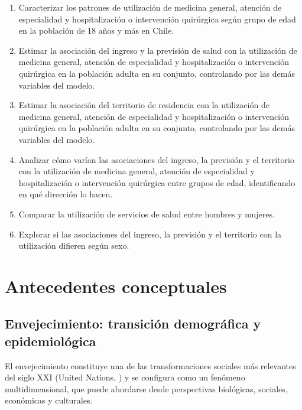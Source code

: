 \documentclass[
  spanish,
  a4paper,
  oneside]{scrbook}
\providecommand{\tightlist}{%
  \setlength{\itemsep}{0pt}\setlength{\parskip}{0pt}}
\begin{document}
\begin{enumerate}
\def\labelenumi{\arabic{enumi}.}
\tightlist
\item
  Caracterizar los patrones de utilización de medicina general, atención
  de especialidad y hospitalización o intervención quirúrgica según
  grupo de edad en la población de 18 años y más en Chile.
\item
  Estimar la asociación del ingreso y la previsión de salud con la
  utilización de medicina general, atención de especialidad y
  hospitalización o intervención quirúrgica en la población adulta en su
  conjunto, controlando por las demás variables del modelo.
\item
  Estimar la asociación del territorio de residencia con la utilización
  de medicina general, atención de especialidad y hospitalización o
  intervención quirúrgica en la población adulta en su conjunto,
  controlando por las demás variables del modelo.
\item
  Analizar cómo varían las asociaciones del ingreso, la previsión y el
  territorio con la utilización de medicina general, atención de
  especialidad y hospitalización o intervención quirúrgica entre grupos
  de edad, identificando en qué dirección lo hacen.
\item
  Comparar la utilización de servicios de salud entre hombres y mujeres.
\item
  Explorar si las asociaciones del ingreso, la previsión y el territorio
  con la utilización difieren según sexo.
\end{enumerate}


\chapter{Antecedentes conceptuales}\label{antecedentes-conceptuales}

\section{Envejecimiento: transición demográfica y
epidemiológica}\label{envejecimiento-transiciuxf3n-demogruxe1fica-y-epidemioluxf3gica}

El envejecimiento constituye una de las transformaciones sociales más
relevantes del siglo XXI (United Nations,
) y se configura como un
fenómeno multidimensional, que puede abordarse desde perspectivas
biológicas, sociales, económicas y culturales.
\end{document}
